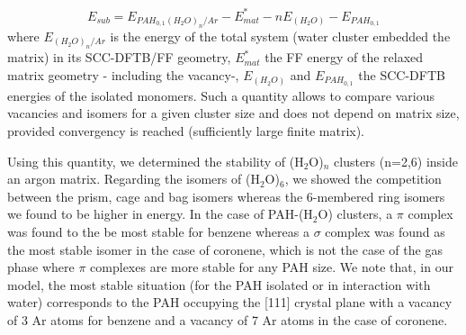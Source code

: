 \documentclass[]{interact}
\theoremstyle{plain}%
\theoremstyle{definition}
\theoremstyle{remark}
\begin{document}
\begin{equation}
E_{sub}=E_{PAH_{0,1}(H_2O)_n/Ar}-E_{mat}^*-nE_{(H_2O)}-E_{PAH_{0,1}}
\end{equation}
where  $E_{(H_2O)_n/Ar}$  is the energy of the total system (water cluster embedded  the matrix) in its SCC-DFTB/FF geometry, $E_{mat}^*$ the FF energy of the relaxed matrix geometry - including the vacancy-, $E_{(H_2O)}$  and $E_{PAH_{0,1}}$ the SCC-DFTB energies of the isolated monomers. Such a quantity allows to compare various vacancies and isomers for a given cluster size  and does not depend on matrix size, provided convergency is reached (sufficiently large finite matrix).

Using this quantity, we determined the stability of (H$_2$O)$_n$ clusters (n=2,6) inside an argon matrix. Regarding the isomers of (H$_2$O)$_6$, we showed the competition between the prism, cage and bag isomers whereas the 6-membered ring isomers we found to be higher in energy.  In the case of PAH-(H$_2$O) clusters, a $\pi$ complex was found to the be most stable for benzene whereas a $\sigma$ complex was found as the most stable isomer in the case of coronene, which is not the case of the gas phase where $\pi$ complexes are more stable for any PAH size. We note that, in our model, the most stable situation (for the PAH isolated or in interaction with water) corresponds to the PAH occupying the [111] crystal plane  with a vacancy of 3 Ar atoms for benzene and a vacancy of 7 Ar atoms in the case of coronene.
\end{document}
